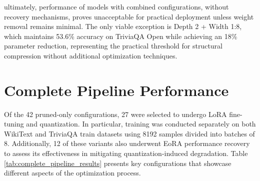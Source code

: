 ultimately, performance of models with combined configurations, without recovery mechanisms, proves unacceptable for practical deployment unless weight removal remains minimal. The only viable exception is Depth 2 + Width 1:8, which maintains 53.6\% accuracy on TriviaQA Open while achieving an 18\% parameter reduction, representing the practical threshold for structural compression without additional optimization techniques.

\section{Complete Pipeline Performance}

Of the 42 pruned-only configurations, 27 were selected to undergo LoRA fine-tuning and quantization. In particular, training was conducted separately on both WikiText and TriviaQA train datasets using 8192 samples divided into batches of 8. Additionally, 12 of these variants also underwent EoRA performance recovery to assess its effectiveness in mitigating quantization-induced degradation. Table \ref{tab:complete_pipeline_results} presents key configurations that showcase different aspects of the optimization process.

